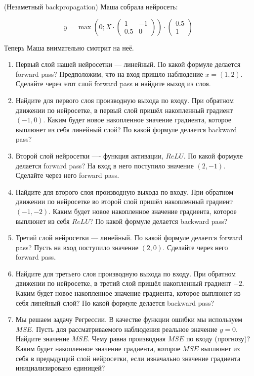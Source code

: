 \begin{problem}{(Незаметный backpropagation)}
    Маша собрала нейросеть: 
	
	\begin{equation*}
	y =   \max \left( 0;  X \cdot  \begin{pmatrix} 1 & -1 \\ 0.5 & 0 \end{pmatrix} \right) \cdot \begin{pmatrix} 0.5 \\ 1 \end{pmatrix} 
	\end{equation*}

	Теперь Маша внимательно смотрит на неё.
	
	\begin{enumerate}
		\item  Первый слой нашей нейросетки --- линейный. По какой формуле делается forward pass? Предположим, что на вход пришло наблюдение $x = (1, 2)$. Сделайте через этот слой forward pass и найдите выход из слоя.
		
		\item Найдите для первого слоя производную выхода по входу. При обратном движении по нейросетке, в первый слой пришёл накопленный градиент $(-1, 0)$. Каким будет новое накопленное значение градиента, которое выплюнет из себя линейный слой? По какой формуле делается backward pass? 
		
		\item Второй слой нейросетки ---- функция активации, $ReLU.$  По какой формуле делается forward pass? На вход в него поступило значение $(2, -1)$. Сделайте через него forward pass. 
		
		\item Найдите для второго слоя производную выхода по входу. При обратном движении по нейросетке во второй слой пришёл накопленный градиент $(-1, -2)$.  Каким будет новое накопленное значение градиента, которое выплюнет из себя $ReLU$?  По какой формуле делается backward pass? 
		
		\item Третий слой нейросетки --- линейный.  По какой формуле делается forward pass? Пусть на вход поступило значение $(2,0)$.  Сделайте через него forward pass. 
		
		\item Найдите для третьего слоя производную выхода по входу. При обратном движении по нейросетке, в третий слой пришёл накопленный градиент $-2$. Каким будет новое накопленное значение градиента, которое выплюнет из себя линейный слой?  По какой формуле делается backward pass? 
		\item Мы решаем задачу Регрессии. В качестве функции ошибки мы используем $MSE$. Пусть для рассматриваемого наблюдения реальное значение $y = 0$. Найдите значение $MSE$. Чему равна производная $MSE$ по входу (прогнозу)? Каким будет накопленное значение градиента, которое $MSE$ выплюнет из себя в предыдущий слой нейросетки, если изначально значение градиента инициализировано единицей? 
		

\end{enumerate}
\end{problem}
